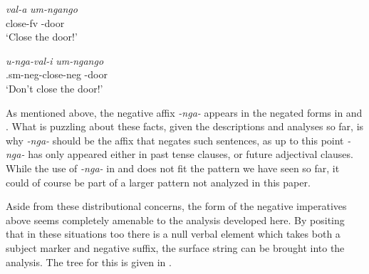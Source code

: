 \documentclass[output=paper]{langsci/langscibook}
\newcommand{\nga}[0]{\textit{-nga- }}
\begin{document}
\begin{exe}
\ex\label{ex:burkholder:28} \begin{xlist}
\ex\label{ex:burkholder:28a} \gll \textit{val-a} \textit{um-ngango}\\
        close-{\sc fv} -door\\
    \glt `Close the door!'


\ex\label{ex:burkholder:28b} \gll \textit{u-nga-val-i} \textit{um-ngango}\\
        .{\sc sm}-{\sc neg}-close-{\sc neg} -door\\
    \glt `Don't close the door!'
\end{xlist}
\end{exe}

As mentioned above, the negative affix \nga appears in the negated forms in  and . What is puzzling about these facts, given the descriptions and analyses so far, is why \nga should be the affix that negates such sentences, as up to this point \nga has only appeared either in past tense clauses, or future adjectival clauses. While the use of \nga in  and  does not fit the pattern we have seen so far, it could of course be part of a larger pattern not analyzed in this paper.

Aside from these distributional concerns, the form of the negative imperatives above seems completely amenable to the analysis developed here. By positing that in these situations too there is a null verbal element which takes both a subject marker and negative suffix, the surface string can be brought into the analysis. The tree for this is given in .
\end{document}
